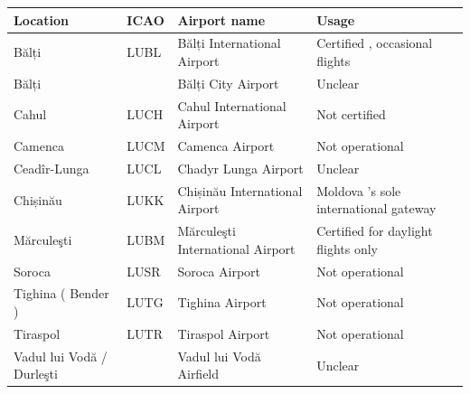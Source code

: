 \documentclass{article}
\begin{document}
\begin{tabular}{llll}
\toprule
Location & ICAO & Airport name & Usage \\
\midrule
Bălți & LUBL & Bălți International Airport & Certified , occasional flights \\
Bălți &  & Bălți City Airport & Unclear \\
Cahul & LUCH & Cahul International Airport & Not certified \\
Camenca & LUCM & Camenca Airport & Not operational \\
Ceadîr-Lunga & LUCL & Chadyr Lunga Airport & Unclear \\
Chișinău & LUKK & Chișinău International Airport & Moldova 's sole international gateway \\
Mărculeşti & LUBM & Mărculeşti International Airport & Certified for daylight flights only \\
Soroca & LUSR & Soroca Airport & Not operational \\
Tighina ( Bender ) & LUTG & Tighina Airport & Not operational \\
Tiraspol & LUTR & Tiraspol Airport & Not operational \\
Vadul lui Vodă / Durleşti &  & Vadul lui Vodă Airfield & Unclear \\
\bottomrule
\end{tabular}
\end{document}
